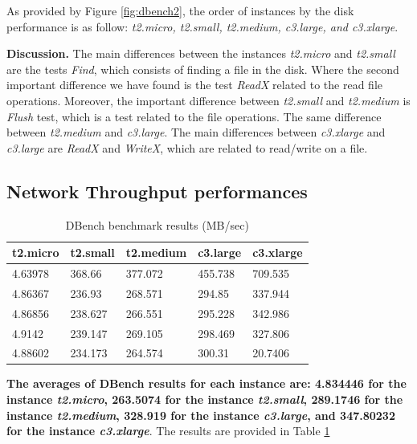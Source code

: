 \documentclass[10pt, conference]{IEEEtran}
\begin{document}
As provided by Figure \ref{fig:dbench2}, the order of instances by the disk performance is as follow: \textit{t2.micro, t2.small, t2.medium, c3.large, and c3.xlarge}.

\textbf{Discussion.} The main differences between the instances \textit{t2.micro} and \textit{t2.small} are the tests \textit{Find}, which consists of finding a file in the disk. Where the second important difference we have found is the test \textit{ReadX} related to the read file operations. Moreover, the important difference between \textit{t2.small} and \textit{t2.medium} is \textit{Flush} test, which is a test related to the file operations. The same difference between \textit{t2.medium} and \textit{c3.large}. The main differences between \textit{c3.xlarge} and \textit{c3.large} are \textit{ReadX} and \textit{WriteX}, which are related to read/write on a file.

\subsection{Network Throughput performances}




\begin{center}
\begin{table}
\begin{center}
\begin{tabular}{|l|l|l|l|l|}
  \hline
t2.micro & t2.small & 	t2.medium & 	c3.large & 	c3.xlarge \\
\hline 
4.63978 &	368.66 &	377.072 &	455.738 &	709.535 \\
4.86367 &	236.93 &	268.571 &	294.85 &	337.944 \\
4.86856 &	238.627 &	266.551 &	295.228 &	342.986 \\
4.9142 &	239.147 &	269.105 &	298.469 &	327.806 \\
4.88602 &	234.173 &	264.574 &	300.31 &	20.7406 \\
\hline
\end{tabular}
\caption{\label{table:DBench10Results} DBench benchmark results (MB/sec)}
\end{center}
\end{table}
\end{center}


\textbf{The averages of DBench results for each instance are: 4.834446 for the instance \textit{t2.micro}, 263.5074 for the instance \textit{t2.small}, 289.1746 for the instance \textit{t2.medium}, 328.919 for the instance \textit{c3.large}, and 347.80232 for the instance \textit{c3.xlarge}}. The results are provided in Table \ref{table:DBench10Results}
\end{document}
